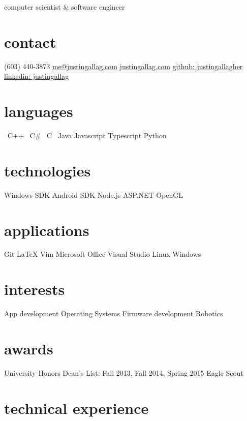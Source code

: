 \documentclass[print]{template/friggeri-cv}
\newcommand{\starr}{\raisebox{0.2ex}{$\star $}}
\begin{document}
    {computer scientist \& software engineer}

    \begin{aside}
        \section{contact}
            (603) 440-3873
            \href{mailto:me@justingallag.com}{me@justingallag.com}
            \href{http://justingallag.com}{justingallag.com}
            \href{https://github.com/justingallagher}{github: justingallagher}
            \href{https://www.linkedin.com/in/justingallag}{linkedin: justingallag}
        \section{languages}
            \starr \ C++
            \starr \ C\#
            \starr \ C
            \starr \ Java
            Javascript
            Typescript
            Python
        \section{technologies}
            Windows SDK
            Android SDK
            Node.js
            ASP.NET
            OpenGL
        \section{applications}
            Git
            LaTeX
            Vim
            Microsoft Office
            Visual Studio
            Linux
            Windows
        \section{interests}
            App development
            Operating Systems
            Firmware development
            Robotics
        \section{awards}
            University Honors
            Dean's List: Fall 2013, Fall 2014, Spring 2015
            Eagle Scout
    \end{aside}

    \section{technical experience}
\end{document}
